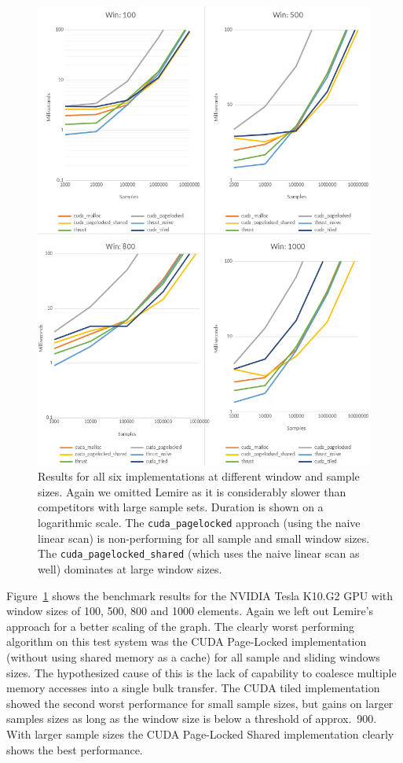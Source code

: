 \begin{figure}[p]
    \centering
    \includegraphics[width=1.0\linewidth]{Figures/tesla_k10g2_ms_vs_samples.png}
    \caption{Results for all six implementations at different window and sample sizes. Again we omitted Lemire as it is considerably slower than competitors with large sample sets. Duration is shown on a logarithmic scale. The \texttt{cuda\_pagelocked} approach (using the naive linear scan) is non-performing for all sample and small window sizes. The \texttt{cuda\_pagelocked\_shared} (which uses the naive linear scan as well) dominates at large window sizes.}
    \label{fig:tesla_k10g2_ms_vs_samples}
\end{figure}

Figure~\ref{fig:tesla_k10g2_ms_vs_samples} shows the benchmark results for the NVIDIA Tesla K10.G2 GPU with window sizes of 100, 500, 800 and 1000 elements. Again we left out Lemire's approach for a better scaling of the graph. The clearly worst performing algorithm on this test system was the CUDA Page-Locked implementation (without using shared memory as a cache) for all sample and sliding windows sizes. The hypothesized cause of this is the lack of capability to coalesce multiple memory accesses into a single bulk transfer. The CUDA tiled implementation showed the second worst performance for small sample sizes, but gains on larger samples sizes as long as the window size is below a threshold of approx.\ 900. With larger sample sizes the CUDA Page-Locked Shared implementation clearly shows the best performance.

